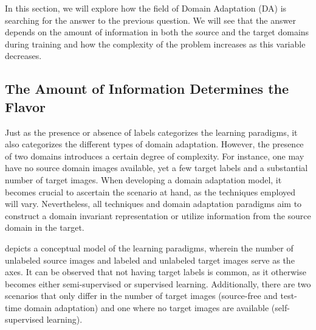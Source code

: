 In this section, we will explore how the field of Domain Adaptation (DA) is searching for the answer to the previous question. We will see that the answer depends on the amount of information in both the source and the target domains during training and how the complexity of the problem increases as this variable decreases.

\subsection{The Amount of Information Determines the Flavor}
Just as the presence or absence of labels categorizes the learning paradigms, it also categorizes the different types of domain adaptation. However, the presence of two domains introduces a certain degree of complexity. For instance, one may have no source domain images available, yet a few target labels and a substantial number of target images. When developing a domain adaptation model, it becomes crucial to ascertain the scenario at hand, as the techniques employed will vary. Nevertheless, all techniques and domain adaptation paradigms aim to construct a domain invariant representation or utilize information from the source domain in the target. 

 depicts a conceptual model of the learning paradigms, wherein the number of unlabeled source images and labeled and unlabeled target images serve as the axes. It can be observed that not having target labels is common, as it otherwise becomes either semi-supervised or supervised learning. Additionally, there are two scenarios that only differ in the number of target images (source-free and test-time domain adaptation) and one where no target images are available (self-supervised learning).

